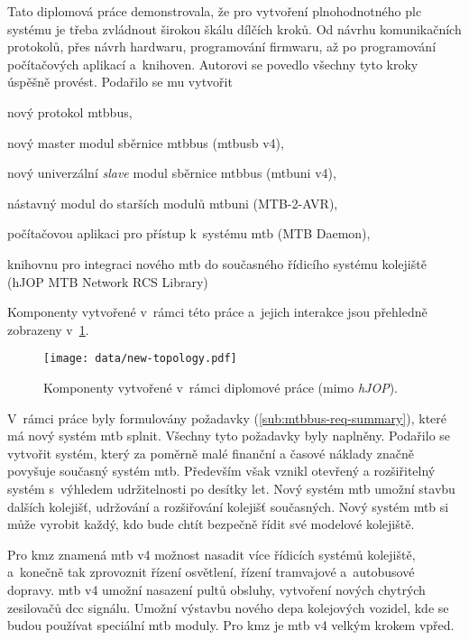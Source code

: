 Tato diplomová práce demonstrovala, že pro vytvoření plnohodnotného \gls{plc}
systému je třeba zvládnout širokou škálu dílčích kroků. Od návrhu komunikačních
protokolů, přes návrh hardwaru, programování firmwaru, až po programování
počítačových aplikací a~knihoven. Autorovi se povedlo všechny tyto kroky
úspěšně provést. Podařilo se mu vytvořit

\begin{compactitem}
\item nový protokol \gls{mtbbus},
\item nový master modul sběrnice \gls{mtbbus} (\gls{mtbusb} v4),
\item nový univerzální \textit{slave} modul sběrnice \gls{mtbbus} (\gls{mtbuni} v4),
\item nástavný modul do starších modulů \gls{mtbuni} (MTB-2-AVR),
\item počítačovou aplikaci pro přístup k~systému \gls{mtb} (MTB Daemon),
\item knihovnu pro integraci nového \gls{mtb} do současného řídicího systému
	kolejiště (hJOP MTB Network RCS Library)
\end{compactitem}

Komponenty vytvořené v~rámci této práce a~jejich interakce jsou přehledně
zobrazeny v~\ref{fig:new-topology}.

\begin{figure}[ht]
\texttt{[image: data/new-topology.pdf]}
\caption{Komponenty vytvořené v~rámci diplomové práce (mimo \textit{hJOP}).}
\label{fig:new-topology}
\end{figure}

V~rámci práce byly formulovány požadavky (\ref{sub:mtbbus-req-summary}), které
má nový systém \gls{mtb} splnit. Všechny tyto požadavky byly naplněny.
Podařilo se vytvořit systém, který za poměrně malé finanční a časové náklady
značně povyšuje současný systém \gls{mtb}. Především však vznikl otevřený
a rozšiřitelný systém s~výhledem udržitelnosti po desítky let. Nový systém
\gls{mtb} umožní stavbu dalších kolejišť, udržování a rozšiřování kolejišť
současných. Nový systém \gls{mtb} si může vyrobit každý, kdo bude chtít bezpečně
řídit své modelové kolejiště.

Pro \gls{kmz} znamená \gls{mtb} v4 možnost nasadit více řídicích systémů
kolejiště, a~konečně tak zprovoznit řízení osvětlení, řízení tramvajové
a~autobusové dopravy. \gls{mtb} v4 umožní nasazení pultů obsluhy,
vytvoření nových chytrých zesilovačů \gls{dcc} signálu. Umožní výstavbu nového
depa kolejových vozidel, kde se budou používat speciální \gls{mtb} moduly.
Pro \gls{kmz} je \gls{mtb} v4 velkým krokem vpřed.


